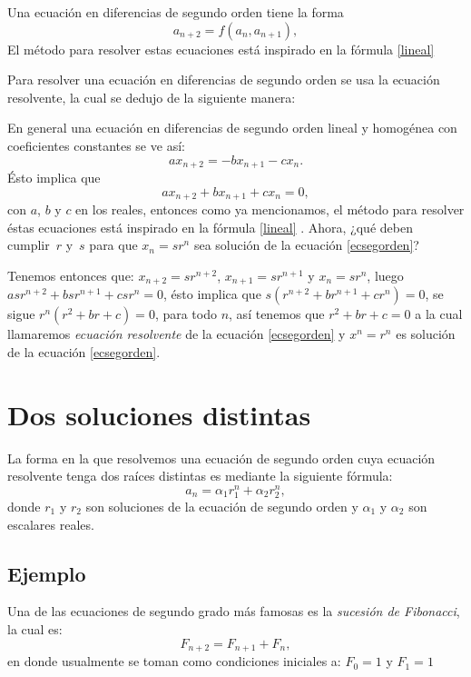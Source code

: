 \documentclass{report}
\begin{document}
Una ecuación en diferencias de segundo orden tiene la forma
\begin{equation}
  \label{ecsegorden1}
  a_{n+2}=f(a_n,a_{n+1}),
\end{equation}
El método para resolver estas ecuaciones está inspirado en la fórmula \eqref{lineal} 

Para resolver una ecuación en diferencias de segundo orden se usa la
ecuación resolvente, la cual se dedujo de la siguiente manera:

En general una ecuación en diferencias de segundo orden lineal y homogénea con coeficientes constantes se ve así:
$$ax_{n+2}=-bx_{n+1}-cx_{n}.$$
Ésto implica que
\begin{equation}
  \label{ecsegorden}
  ax_{n+2}+bx_{n+1}+cx_{n}=0,
\end{equation}
con $a$, $b$ y $c$ en los reales, entonces como ya mencionamos, el método
para resolver éstas ecuaciones está inspirado en la fórmula \eqref{lineal}
. Ahora, ¿qué deben cumplir~$r$ y~$s$ para que $x_n=sr^n$
sea solución de la ecuación \eqref{ecsegorden}?

Tenemos entonces que: $x_{n+2}=sr^{n+2}$, $x_{n+1}=sr^{n+1}$ y
$x_{n}=sr^{n}$, luego~$asr^{n+2}+bsr^{n+1}+csr^n=0$, ésto implica que
$s(r^{n+2}+br^{n+1}+cr^n)=0$, se sigue $r^n (r^2+br+c)=0$, para todo
$n$, así tenemos que $r^2+br+c=0$ a la cual llamaremos
\textit{ecuación resolvente} de la ecuación \eqref{ecsegorden} y
$x^n=r^n$ es solución de la ecuación \eqref{ecsegorden}.



\section{Dos soluciones distintas}
\label{sec:distintas}
La forma en la que resolvemos una ecuación de segundo orden cuya
ecuación resolvente tenga dos raíces distintas es mediante la
siguiente fórmula:
\begin{equation}
 \label{raicesdistintas}
 a_n=\alpha_1r_1^n +\alpha_2r_2^n,
\end{equation}
donde $r_1$ y $r_2$ son soluciones de la ecuación de segundo orden y
$\alpha_1$ y $\alpha_2$ son escalares reales.
\subsection{Ejemplo}

Una de las ecuaciones de segundo grado más famosas es la \textit{sucesión de
  Fibonacci}, la cual es:
\begin{equation}
  \label{eq:fibonacci}
F_{n+2}=F_{n+1}+F_{n},  
\end{equation}
en donde usualmente se toman como condiciones iniciales a: $F_{0}=1$ y $F_{1}=1$
\end{document}
